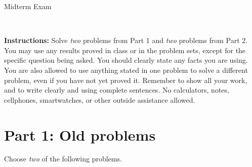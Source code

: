 \documentclass[11pt]{article}
\title{}
\date{\vspace{-0.5in}}
\theoremstyle{definition}
\begin{document}
\thispagestyle{fancy}
\pagestyle{fancy}

\vspace{3em}

\begin{center}
	{\LARGE Midterm Exam}
\end{center}

\

\noindent
{\bf Instructions:}
Solve \emph{two} problems from Part 1 and \emph{two} problems from Part 2. You may use any results proved in class or in the problem sets, except for the specific question being asked. You should clearly state any facts you are using. You are also allowed to use anything stated in
one problem to solve a different problem, even if you have not yet proved it. Remember to show
all your work, and to write clearly and using complete sentences. No calculators, notes, cellphones,
smartwatches, or other outside assistance allowed.

\section*{Part 1: Old problems}

Choose \emph{two} of the following problems.
\end{document}
